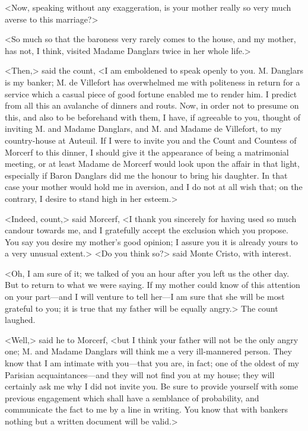  <Now, speaking without any exaggeration, is your mother really so very much averse to this marriage?> 

 <So much so that the baroness very rarely comes to the house, and my mother, has not, I think, visited Madame Danglars twice in her whole life.> 

 <Then,> said the count, <I am emboldened to speak openly to you. M. Danglars is my banker; M. de Villefort has overwhelmed me with politeness in return for a service which a casual piece of good fortune enabled me to render him. I predict from all this an avalanche of dinners and routs. Now, in order not to presume on this, and also to be beforehand with them, I have, if agreeable to you, thought of inviting M. and Madame Danglars, and M. and Madame de Villefort, to my country-house at Auteuil. If I were to invite you and the Count and Countess of Morcerf to this dinner, I should give it the appearance of being a matrimonial meeting, or at least Madame de Morcerf would look upon the affair in that light, especially if Baron Danglars did me the honour to bring his daughter. In that case your mother would hold me in aversion, and I do not at all wish that; on the contrary, I desire to stand high in her esteem.> 

 <Indeed, count,> said Morcerf, <I thank you sincerely for having used so much candour towards me, and I gratefully accept the exclusion which you propose. You say you desire my mother's good opinion; I assure you it is already yours to a very unusual extent.>  <Do you think so?> said Monte Cristo, with interest. 

 <Oh, I am sure of it; we talked of you an hour after you left us the other day. But to return to what we were saying. If my mother could know of this attention on your part—and I will venture to tell her—I am sure that she will be most grateful to you; it is true that my father will be equally angry.> The count laughed. 

 <Well,> said he to Morcerf, <but I think your father will not be the only angry one; M. and Madame Danglars will think me a very ill-mannered person. They know that I am intimate with you—that you are, in fact; one of the oldest of my Parisian acquaintances—and they will not find you at my house; they will certainly ask me why I did not invite you. Be sure to provide yourself with some previous engagement which shall have a semblance of probability, and communicate the fact to me by a line in writing. You know that with bankers nothing but a written document will be valid.> 

